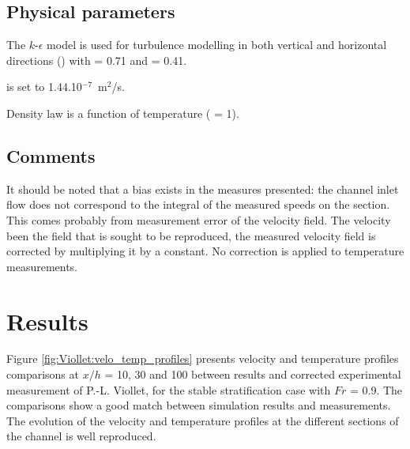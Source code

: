 \subsection{Physical parameters}

The $k$-$\epsilon$ model is used for turbulence modelling in both vertical and
horizontal directions
()
with  = 0.71 and  = 0.41.

 is set to
1.44.10$^{-7}$~m$^2$/s.

Density law is a function of temperature ( = 1).

\subsection{Comments}

It should be noted that a bias exists in the measures presented:
the channel inlet flow does not correspond to the integral of the
measured speeds on the section.
This comes probably from measurement error of the velocity field.
The velocity been the field that is sought to be reproduced, the
measured velocity field is corrected by multiplying it by a constant.
No correction is applied to temperature measurements.

\section{Results}

Figure \ref{fig:Viollet:velo_temp_profiles} presents velocity and temperature
profiles comparisons at $x/h$ = 10, 30 and 100 between  results and
corrected experimental measurement of P.-L. Viollet, for the stable
stratification case with $Fr$ = 0.9.
The comparisons show a good match between simulation results and
measurements.
The evolution of the velocity and temperature profiles at the different
sections of the channel is well reproduced.

